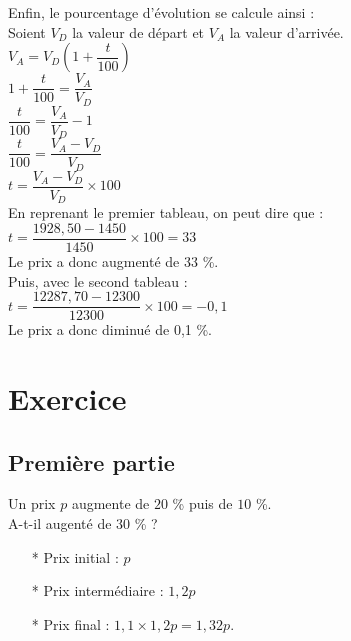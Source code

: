 Enfin, le pourcentage d'évolution se calcule ainsi : \\

Soient $V_D$ la valeur de départ et $V_A$ la valeur d'arrivée. \\

$V_A = V_D \left(1 + \dfrac{t}{100} \right) $ \\

$ 1 + \dfrac{t}{100} = \dfrac{V_A}{V_D} $ \\

$ \dfrac{t}{100} = \dfrac{V_A}{V_D} - 1 $ \\

$ \dfrac{t}{100} = \dfrac{V_A - V_D}{V_D} $ \\

$ t = \dfrac{V_A - V_D}{V_D} \times 100 $ \\

En reprenant le premier tableau, on peut dire que : \\

$ t = \dfrac{1928,50 - 1450}{1450} \times 100 = 33 $ \\

Le prix a donc augmenté de 33 \%. \\

Puis, avec le second tableau :  \\

$ t = \dfrac{12287,70 - 12300}{12300} \times 100 = -0,1 $ \\

Le prix a donc diminué de 0,1 \%.

\newpage

\section{Exercice }

\subsection*{Première partie}

Un prix $p$ augmente de $20$ \% puis de $10$ \%. \\

A-t-il augenté de $30$ \% ? \\

\begin{enumerate}
\item[*] Prix initial : $p$
\item[*] Prix intermédiaire : $1,2p$
\item[*] Prix final : $1,1 \times 1,2p = 1,32 p $. 
\end{enumerate} 

